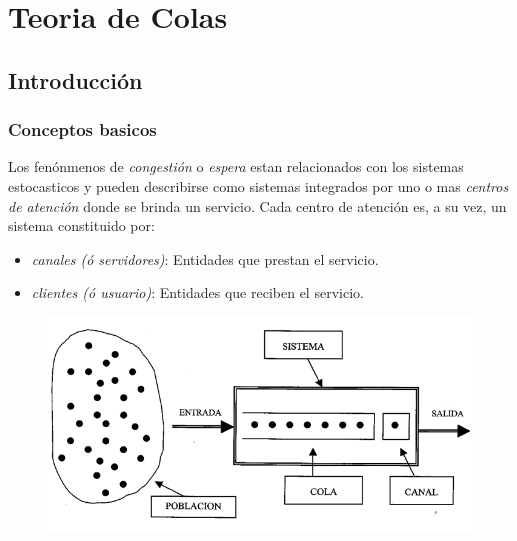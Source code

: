 \documentclass{article}
\begin{document}
\newpage{}
\tableofcontents
\newpage{}

\newpage
\section{Teoria de Colas}

\subsection{Introducción}
\subsubsection{Conceptos basicos}

Los fenónmenos de \textit{congestión} o \textit{espera} estan relacionados con los sistemas estocasticos y pueden describirse como sistemas integrados por uno o mas \textit{centros de atención} donde se brinda un servicio.
Cada centro de atención es, a su vez, un sistema constituido por:

\begin{itemize}
    \item \textit{canales (ó servidores)}: Entidades que prestan el servicio. 
    \item \textit{clientes (ó usuario)}: Entidades que reciben el servicio. 
\end{itemize}

    \begin{figure}[h!]
        \includegraphics[width=\linewidth]{imagenes/modelo_sistema.png}
    \end{figure}
\end{document}
